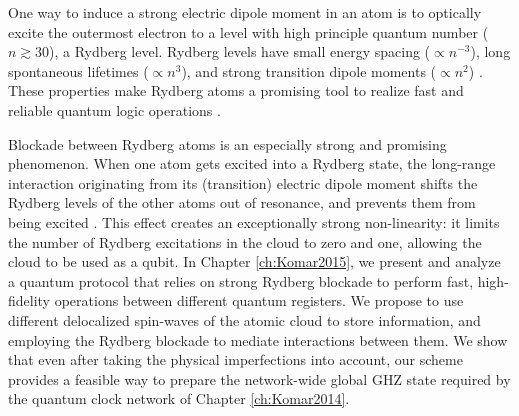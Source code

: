 One way to induce a strong electric dipole moment in an atom is to optically
excite the outermost electron to a level with high principle quantum number ($n
\gtrsim 30$), a Rydberg level. Rydberg levels have small energy spacing
($\propto n^{-3}$), long spontaneous lifetimes ($\propto n^3$), and strong
transition dipole moments ($\propto n^2$) \cite{Saffman2010}. These properties
make Rydberg atoms a promising tool to realize fast and reliable quantum
logic operations \cite{Lukin2001}.  

Blockade between Rydberg atoms is an especially strong and promising phenomenon.
When one atom gets excited into a Rydberg state, the long-range interaction
originating from its (transition) electric dipole moment shifts the Rydberg
levels of the other atoms out of resonance, and prevents them from being excited
\cite{Urban2009}. This effect creates an exceptionally strong non-linearity: it
limits the number of Rydberg excitations in the cloud to zero and one, allowing
the cloud to be used as a qubit. In Chapter \ref{ch:Komar2015}, we present and
analyze a quantum protocol that relies on strong Rydberg blockade to perform
fast, high-fidelity operations between different quantum registers. We propose
to use different delocalized spin-waves of the atomic cloud to store
information, and employing the Rydberg blockade to mediate interactions between
them. We show that even after taking the physical imperfections into account,
our scheme provides a feasible way to prepare the network-wide global GHZ state
required by the quantum clock network of Chapter \ref{ch:Komar2014}.

 









